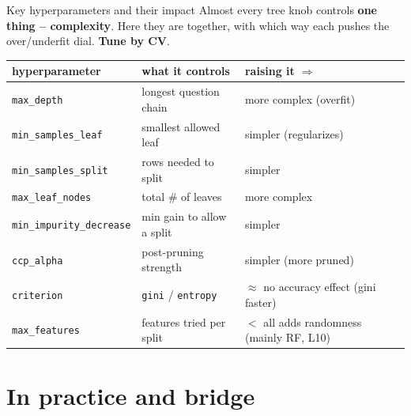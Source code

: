 \documentclass[aspectratio=169]{beamer}
\begin{document}
\begin{frame}{Key hyperparameters and their impact}
  Almost every tree knob controls \textbf{one thing -- complexity}. Here they are
  together, with which way each pushes the over/underfit dial. \textbf{Tune by CV}.
  \vskip 2pt
  \begin{center}\footnotesize
    \renewcommand{\arraystretch}{1.2}
    \begin{tabular}{l l l}
      hyperparameter & what it controls & raising it $\Rightarrow$ \\
      \hline
      \texttt{max\_depth} & longest question chain & more complex (\textcolor{armred}{overfit}) \\
      \texttt{min\_samples\_leaf} & smallest allowed leaf & simpler (\textcolor{armblue}{regularizes}) \\
      \texttt{min\_samples\_split} & rows needed to split & simpler \\
      \texttt{max\_leaf\_nodes} & total \# of leaves & more complex \\
      \texttt{min\_impurity\_decrease} & min gain to allow a split & simpler \\
      \texttt{ccp\_alpha} & post-pruning strength & simpler (more pruned) \\
      \texttt{criterion} & \texttt{gini} / \texttt{entropy} & $\approx$ no accuracy effect (gini faster) \\
      \texttt{max\_features} & features tried per split & $<$ all adds randomness (mainly RF, L10) \\
      \hline
    \end{tabular}
  \end{center}
  \vskip 2pt
\end{frame}

\section{In practice and bridge}
\end{document}
